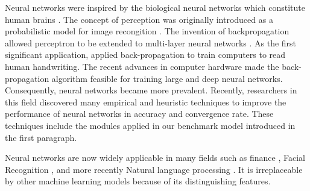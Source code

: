 Neural networks were inspired by the biological neural networks which constitute human brains \citep{10.2307/4299364}.
The concept of perception was originally introduced as a probabilistic model for image recongition \citep{rosenblatt}.
The invention of backpropagation allowed perceptron to be extended to multi-layer neural networks \citep{58337}.
As the first significant application, \citet{NIPS1989293} applied back-propagation to train computers to read human handwriting. 
The recent advances in computer hardware made the back-propagation algorithm feasible for training large and deep neural networks. 
Consequently, neural networks became more prevalent. 
Recently, researchers in this field discovered many empirical and heuristic techniques to improve the performance of neural networks in accuracy and convergence rate. These techniques include the modules applied in our benchmark model introduced in the first paragraph.



Neural networks are now widely applicable in many fields such as finance \citep{Azoff:1994:NNT:561452,KAASTRA1996215}, Facial Recognition \citep{554195,655647}, and more recently Natural language processing \citep{Collobert:2008:UAN:1390156.1390177,Collobert:2011:NLP:1953048.2078186}.  It is irreplaceable by other machine learning models because of its distinguishing features. 

